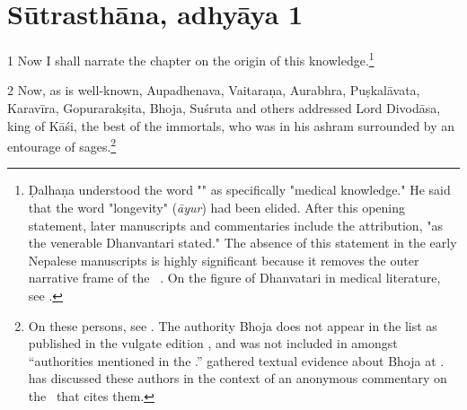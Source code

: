     \section{Sūtrasthāna, adhyāya 1}


\begin{translation}
    
    \item[1] Now I shall narrate the chapter on the origin of this
    knowledge.\footnote{Ḍalhaṇa understood the word "" as
    specifically "medical knowledge." He said that the word "longevity"
    (\emph{āyur})  had been elided.
    After this opening statement, later manuscripts and commentaries include
    the attribution, "as the venerable Dhanvantari stated."  The absence of this
    statement in the early Nepalese manuscripts is highly significant because it 
    removes
    the outer narrative frame of the \SS\
    \parencites[148]{wuja-2013}[\S\,3.1.2]{kleb-2021b}{rai-2019}{birc-2021}.  On 
    the 
    figure of Dhanvatari in 
    medical literature, see \cite[IA 358--361]{meul-hist}.} %
    
    \item[2] Now, as is well-known, Aupadhenava, Vaitaraṇa, Aurabhra, Puṣkalāvata,
    Karavīra, Gopurarakṣita, Bhoja, Suśruta and others addressed Lord Divodāsa,
    king of Kāśi, the best of the immortals, who was in his ashram surrounded by
    an entourage of sages.\footnote{On these persons, see \cite[IA
    361--363, 369\,ff.]{meul-hist}. The authority Bhoja does not appear in the list as
    published in the vulgate edition \citep[1]{susr-trikamji2}, and was not
    included in \cite{meul-hist} amongst “authorities mentioned in the \SS.” 
    \citeauthor{meul-hist} gathered textual evidence about Bhoja at \cite[IA
    690--691]{meul-hist}. \citet{kleb-2021a} has discussed these authors in the
    context of an anonymous commentary on the \SS\ that cites them.}
    

\end{translation}
